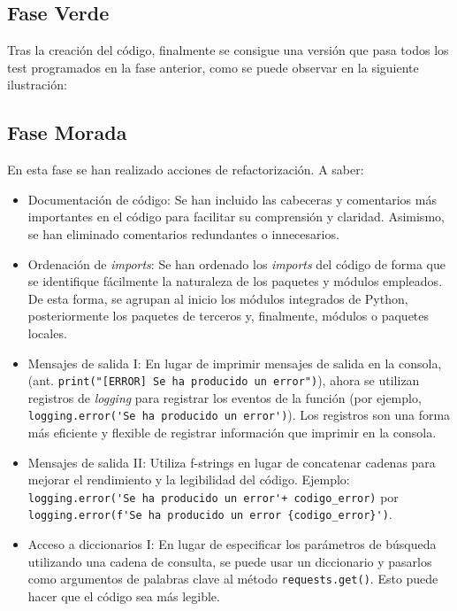 \subsection{Fase Verde}
Tras la creación del código, finalmente se consigue una versión que pasa todos los test programados en la fase anterior, como se puede observar en la siguiente ilustración:


\subsection{Fase Morada}
En esta fase se han realizado acciones de refactorización. A saber:

\begin{itemize}
    \item Documentación de código:
    Se han incluido las cabeceras y comentarios más importantes en el código para facilitar su comprensión y claridad. Asimismo, se han eliminado comentarios redundantes o innecesarios.

    \item Ordenación de \textit{imports}:
    Se han ordenado los \textit{imports} del código de forma que se identifique fácilmente la naturaleza de los paquetes y módulos empleados. De esta forma, se agrupan al inicio los módulos integrados de Python, posteriormente los paquetes de terceros y, finalmente, módulos o paquetes locales.
    
    \item Mensajes de salida I:
    En lugar de imprimir mensajes de salida en la consola, (ant. \verb|print("[ERROR] Se ha producido un error")|), ahora se utilizan registros de \textit{logging} para registrar los eventos de la función (por ejemplo, \verb|logging.error('Se ha producido un error')|). Los registros son una forma más eficiente y flexible de registrar información que imprimir en la consola.
        
    \item Mensajes de salida II:
    Utiliza f-strings en lugar de concatenar cadenas para mejorar el rendimiento y la legibilidad del código. Ejemplo: \verb|logging.error('Se ha producido un error'+ codigo_error)| por \verb|logging.error(f'Se ha producido un error {codigo_error}')|.

    \item Acceso a diccionarios I:
    En lugar de especificar los parámetros de búsqueda utilizando una cadena de consulta, se puede usar un diccionario y pasarlos como argumentos de palabras clave al método \verb|requests.get()|. Esto puede hacer que el código sea más legible.


\end{itemize}
